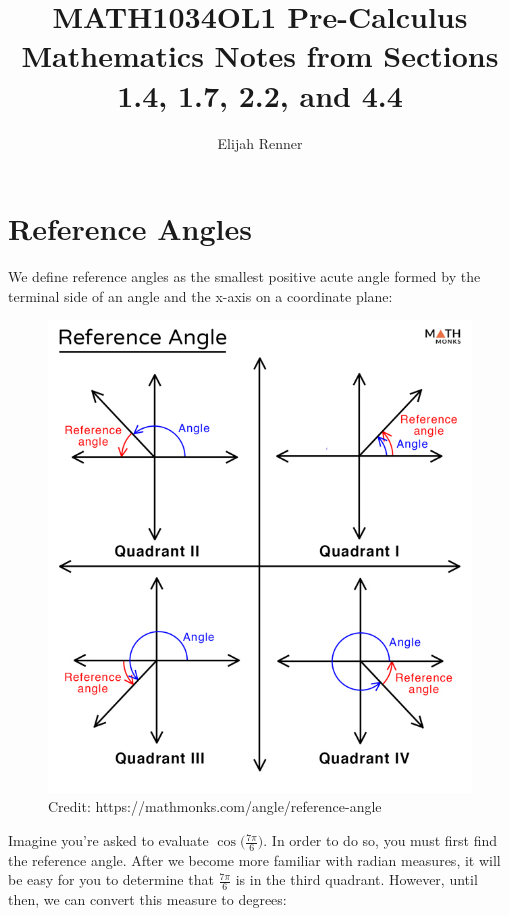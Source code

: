 \documentclass[12pt]{article}
\title{MATH1034OL1 Pre-Calculus Mathematics Notes from Sections 1.4, 1.7, 2.2, and 4.4}
\author{Elijah Renner}
\begin{document}
\maketitle

\vspace{0.5in}

\tableofcontents





\section{Reference Angles}
We define reference angles as the smallest positive acute angle formed by the terminal side of an angle and the x-axis on a coordinate plane:\\

\begin{figure}[ht]
	\centering
	\includegraphics[scale=0.25]{Reference-Angle}
	\caption{Credit: https://mathmonks.com/angle/reference-angle}
\end{figure}

Imagine you're asked to evaluate \(\cos({\frac{7\pi}{6})}\). In order to do so, you must first find the reference angle. After we become more familiar with radian measures, it will be easy for you to determine that \(\frac{7\pi}{6}\) is in the third quadrant. However, until then, we can convert this measure to degrees: \\
\end{document}
